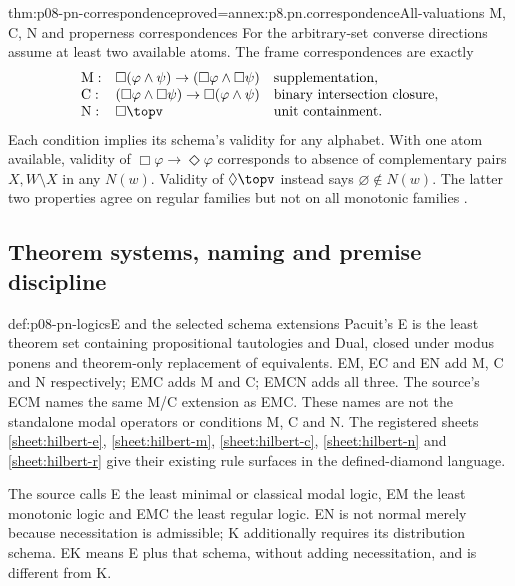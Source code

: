 \begin{hbtheorem}{thm:p08-pn-correspondence}{proved=annex:p8.pn.correspondence}{All-valuations M, C, N and properness correspondences}
For the arbitrary-set converse directions assume at least two available
atoms. The frame correspondences are exactly
\[
\begin{array}{lll}
 \mathrm M:&\Box(\varphi\land\psi)\to(\Box\varphi\land\Box\psi)
      &\text{supplementation},\\
 \mathrm C:&(\Box\varphi\land\Box\psi)\to\Box(\varphi\land\psi)
      &\text{binary intersection closure},\\
 \mathrm N:&\Box\topv&\text{unit containment}.
\end{array}
\]
Each condition implies its schema's validity for any alphabet.
With one atom available, validity of
\(\Box\varphi\to\Diamond\varphi\) corresponds to absence
of complementary pairs \(X,W\setminus X\) in any \(N(w)\).
Validity of \(\Diamond\topv\) instead says
\(\varnothing\notin N(w)\). The latter two properties agree
on regular families but not on all monotonic families
\cite[lemmas~2.19--2.22]{Pacuit2017}.
\end{hbtheorem}

\subsection{Theorem systems, naming and premise discipline}

\begin{hbdefinition}{def:p08-pn-logics}{E and the selected schema extensions}
Pacuit's E is the least theorem set containing propositional tautologies
and Dual, closed under modus ponens and theorem-only replacement of
equivalents. EM, EC and EN add M, C and N respectively; EMC adds M
and C; EMCN adds all three. The source's ECM names the same M/C
extension as EMC. These names are not the standalone modal operators
or conditions M, C and N. The registered sheets
\ref{sheet:hilbert-e}, \ref{sheet:hilbert-m}, \ref{sheet:hilbert-c},
\ref{sheet:hilbert-n} and \ref{sheet:hilbert-r} give their existing
rule surfaces in the defined-diamond language.

The source calls E the least minimal or classical modal logic, EM the
least monotonic logic and EMC the least regular logic. EN is not normal
merely because necessitation is admissible; K additionally requires its
distribution schema. EK means E plus that schema, without adding
necessitation, and is different from K.
\end{hbdefinition}

